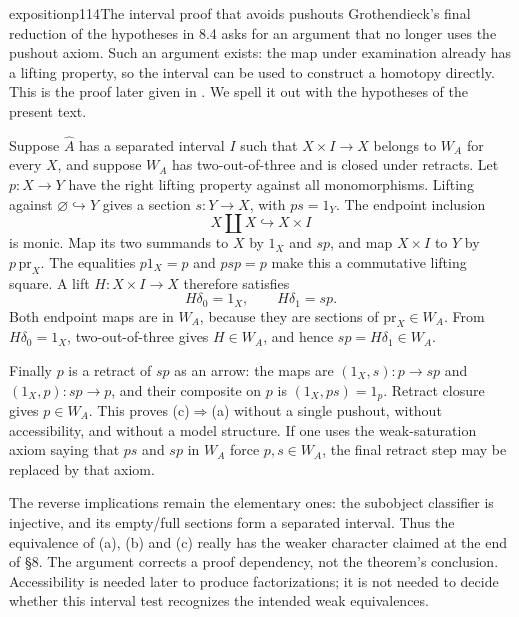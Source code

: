 \begin{dcomment}{exposition}{p114}{The interval proof that avoids pushouts}
Grothendieck's final reduction of the hypotheses in 8.4 asks for an argument that no longer uses the pushout axiom. Such an argument exists: the map under examination already has a lifting property, so the interval can be used to construct a homotopy directly. This is the proof later given in \citet[Lemma 1.4.13, printed pp.~56--57]{Cisinski2006}. We spell it out with the hypotheses of the present text.

Suppose $\widehat A$ has a separated interval $I$ such that $X\times I\to X$ belongs to $W_A$ for every $X$, and suppose $W_A$ has two-out-of-three and is closed under retracts. Let $p:X\to Y$ have the right lifting property against all monomorphisms. Lifting against $\varnothing\hookrightarrow Y$ gives a section $s:Y\to X$, with $ps=1_Y$. The endpoint inclusion
\[
 X\amalg X\hookrightarrow X\times I
\]
is monic. Map its two summands to $X$ by $1_X$ and $sp$, and map $X\times I$ to $Y$ by $p\,\mathrm{pr}_X$. The equalities $p1_X=p$ and $psp=p$ make this a commutative lifting square. A lift $H:X\times I\to X$ therefore satisfies
\[
 H\delta_0=1_X,\qquad H\delta_1=sp.
\]
Both endpoint maps are in $W_A$, because they are sections of $\mathrm{pr}_X\in W_A$. From $H\delta_0=1_X$, two-out-of-three gives $H\in W_A$, and hence $sp=H\delta_1\in W_A$.

Finally $p$ is a retract of $sp$ as an arrow: the maps are $(1_X,s):p\to sp$ and $(1_X,p):sp\to p$, and their composite on $p$ is $(1_X,ps)=1_p$. Retract closure gives $p\in W_A$. This proves (c)$\Rightarrow$(a) without a single pushout, without accessibility, and without a model structure. If one uses the weak-saturation axiom saying that $ps$ and $sp$ in $W_A$ force $p,s\in W_A$, the final retract step may be replaced by that axiom.

The reverse implications remain the elementary ones: the subobject classifier is injective, and its empty/full sections form a separated interval. Thus the equivalence of (a), (b) and (c) really has the weaker character claimed at the end of \S8. The argument corrects a proof dependency, not the theorem's conclusion. Accessibility is needed later to produce factorizations; it is not needed to decide whether this interval test recognizes the intended weak equivalences.
\end{dcomment}

